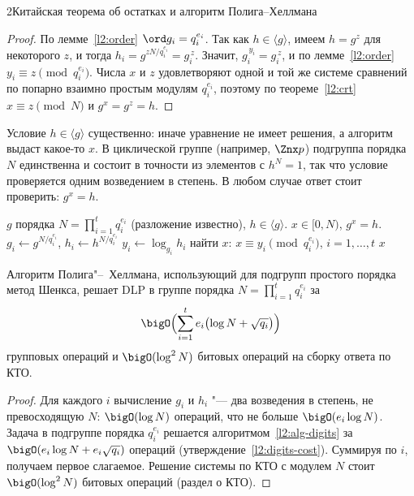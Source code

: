 \begin{lecture}{2}{Китайская теорема об остатках и алгоритм Полига–Хеллмана}
\begin{proof}
По лемме~\ref{l2:order} $\ord g_i = q_i^{e_i}$. Так как $h \in \langle g \rangle$, имеем $h = g^{z}$
для некоторого $z$, и тогда $h_i = g^{z N / q_i^{e_i}} = g_i^{\,z}$. Значит, $g_i^{\,y_i} = g_i^{\,z}$,
и по лемме~\ref{l2:order} $y_i \equiv z \pmod{q_i^{e_i}}$. Числа $x$ и $z$ удовлетворяют одной и той же
системе сравнений по попарно взаимно простым модулям $q_i^{e_i}$, поэтому по теореме~\ref{l2:crt}
$x \equiv z \pmod N$ и $g^x = g^z = h$.
\end{proof}

\begin{remark}
Условие $h \in \langle g \rangle$ существенно: иначе уравнение не имеет решения, а алгоритм выдаст
какое-то $x$. В циклической группе (например, $\Znx p$) подгруппа порядка $N$ единственна и
состоит в точности из элементов с $h^N = 1$, так что условие проверяется одним возведением в
степень. В любом случае ответ стоит проверить: $g^x = h$.
\end{remark}

\begin{algorithm}\label{l2:alg-ph}
\begin{algorithmic}[1]
\Require $g$ порядка $N = \prod_{i=1}^{t} q_i^{e_i}$ (разложение известно), $h \in \langle g \rangle$.
\Ensure $x \in [0, N)$, $g^x = h$.
  \State $g_i \gets g^{N / q_i^{e_i}}$, \quad $h_i \gets h^{N / q_i^{e_i}}$
  \State $y_i \gets \log_{g_i} h_i$ 
\EndFor
\State найти $x$: $x \equiv y_i \pmod{q_i^{e_i}}$, $i = 1, \dots, t$ 
\State \Return $x$
\end{algorithmic}
\end{algorithm}

\begin{theorem}\label{l2:ph-cost}
Алгоритм Полига"--~Хеллмана, использующий для подгрупп простого порядка метод Шенкса, решает DLP
в группе порядка $N = \prod_{i=1}^{t} q_i^{e_i}$ за
\[
  \bigO\Bigl(\sum_{i=1}^{t} e_i \bigl(\log N + \sqrt{q_i}\bigr)\Bigr)
\]
групповых операций и $\bigO(\log^2 N)$ битовых операций на сборку ответа по КТО.
\end{theorem}

\begin{proof}
Для каждого $i$ вычисление $g_i$ и $h_i$ "--- два возведения в степень, не превосходящую $N$:
$\bigO(\log N)$ операций, что не больше $\bigO(e_i \log N)$. Задача в подгруппе порядка
$q_i^{e_i}$ решается алгоритмом~\ref{l2:alg-digits} за $\bigO(e_i \log N + e_i \sqrt{q_i})$
операций (утверждение~\ref{l2:digits-cost}). Суммируя по $i$, получаем первое слагаемое.
Решение системы по КТО с модулем $N$ стоит $\bigO(\log^2 N)$ битовых операций (раздел о КТО).
\end{proof}


\end{lecture}

